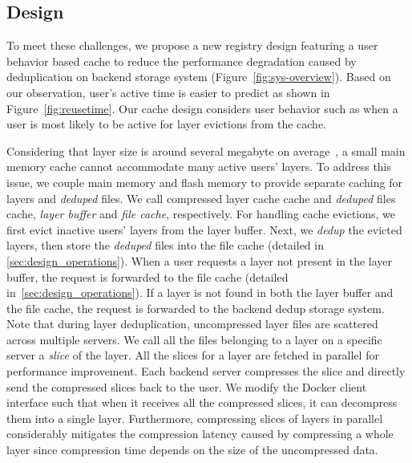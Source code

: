 \subsection{Design}
To meet these challenges, we propose a new registry design featuring a user
behavior based cache to reduce the performance degradation caused by
deduplication on backend storage system (Figure~\ref{fig:sys-overview}).  Based
on our observation, user's active time is easier to predict as shown in
Figure~\ref{fig:reusetime}. Our cache design considers user
behavior such as when a user is most likely to be active for
layer evictions from the cache.

Considering that layer size is around several megabyte on
average~\cite{dockerworkload}, a small main memory cache cannot accommodate
many active users' layers. To address this issue, we couple main memory and
flash memory to provide separate caching for layers and \emph{deduped} files.
We call compressed layer cache cache and \emph{deduped} files cache,
\emph{layer buffer} and \emph{file cache}, respectively.
For handling
cache evictions, we first evict inactive users' layers from the layer buffer.
Next, we \emph{dedup} the evicted layers, then store the \emph{deduped} files
into the file cache (detailed in \cref{sec:design_operations}). 
When a user requests a
layer not present in the layer buffer, the request is forwarded to the
file cache (detailed in~\cref{sec:design_operations}). 
If a layer is not found in both the layer buffer and the
file cache, the request is forwarded to the backend dedup storage system.
Note that during layer deduplication, uncompressed layer files are
scattered across multiple servers.
We call all the files belonging to a layer on a specific server a
\emph{slice} of the layer.
All the slices for a layer are fetched in parallel for performance improvement.
%
%
Each backend server compresses the slice and directly send the compressed slices back to the user.
We modify the Docker client
interface such that when it receives all the compressed slices, it can
decompress them into a single layer. 
Furthermore, compressing slices
of layers in parallel considerably mitigates the compression latency caused by
compressing a whole layer since compression time depends on the size of the
uncompressed data.




 
